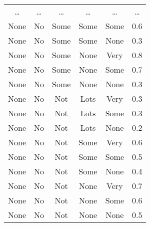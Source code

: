 \begin{tabular}{|c|c|c|c|c|c|}
\ldots &\ldots &\ldots &\ldots &\ldots &\ldots \\
None	&	No	&	Some	&	Some	&	Some	&	0.6	\\
None	&	No	&	Some	&	Some	&	None	&	0.3	\\
None	&	No	&	Some	&	None	&	Very	&	0.8	\\
None	&	No	&	Some	&	None	&	Some	&	0.7	\\
None	&	No	&	Some	&	None	&	None	&	0.3	\\
None	&	No	&	Not	&	Lots	&	Very	&	0.3	\\
None	&	No	&	Not	&	Lots	&	Some	&	0.3	\\
None	&	No	&	Not	&	Lots	&	None	&	0.2	\\
None	&	No	&	Not	&	Some	&	Very	&	0.6	\\
None	&	No	&	Not	&	Some	&	Some	&	0.5	\\
None	&	No	&	Not	&	Some	&	None	&	0.4	\\
None	&	No	&	Not	&	None	&	Very	&	0.7	\\
None	&	No	&	Not	&	None	&	Some	&	0.6	\\
None	&	No	&	Not	&	None	&	None	&	0.5	\\
\hline
\end{tabular}